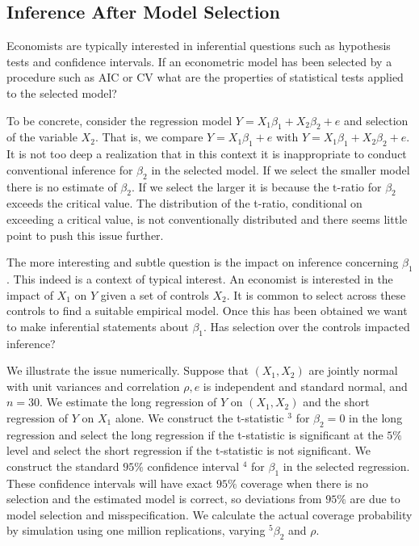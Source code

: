 \documentclass[10pt]{article}
\begin{document}
\subsection{Inference After Model Selection}
Economists are typically interested in inferential questions such as hypothesis tests and confidence intervals. If an econometric model has been selected by a procedure such as AIC or CV what are the properties of statistical tests applied to the selected model?

To be concrete, consider the regression model $Y=X_{1} \beta_{1}+X_{2} \beta_{2}+e$ and selection of the variable $X_{2}$. That is, we compare $Y=X_{1} \beta_{1}+e$ with $Y=X_{1} \beta_{1}+X_{2} \beta_{2}+e$. It is not too deep a realization that in this context it is inappropriate to conduct conventional inference for $\beta_{2}$ in the selected model. If we select the smaller model there is no estimate of $\beta_{2}$. If we select the larger it is because the $\mathrm{t}$-ratio for $\beta_{2}$ exceeds the critical value. The distribution of the t-ratio, conditional on exceeding a critical value, is not conventionally distributed and there seems little point to push this issue further.

The more interesting and subtle question is the impact on inference concerning $\beta_{1}$. This indeed is a context of typical interest. An economist is interested in the impact of $X_{1}$ on $Y$ given a set of controls $X_{2}$. It is common to select across these controls to find a suitable empirical model. Once this has been obtained we want to make inferential statements about $\beta_{1}$. Has selection over the controls impacted inference?

We illustrate the issue numerically. Suppose that $\left(X_{1}, X_{2}\right)$ are jointly normal with unit variances and correlation $\rho, e$ is independent and standard normal, and $n=30$. We estimate the long regression of $Y$ on $\left(X_{1}, X_{2}\right)$ and the short regression of $Y$ on $X_{1}$ alone. We construct the t-statistic ${ }^{3}$ for $\beta_{2}=0$ in the long regression and select the long regression if the t-statistic is significant at the $5 \%$ level and select the short regression if the $\mathrm{t}$-statistic is not significant. We construct the standard $95 \%$ confidence interval ${ }^{4}$ for $\beta_{1}$ in the selected regression. These confidence intervals will have exact $95 \%$ coverage when there is no selection and the estimated model is correct, so deviations from $95 \%$ are due to model selection and misspecification. We calculate the actual coverage probability by simulation using one million replications, varying ${ }^{5} \beta_{2}$ and $\rho$.
\end{document}
